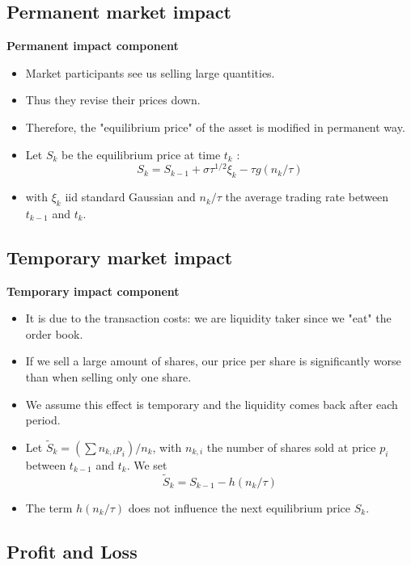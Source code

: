 \documentclass[10pt]{article}
\begin{document}
\subsection{Permanent market impact}

\textbf{Permanent impact component}

\begin{itemize} 
    \item Market participants see us selling large quantities.
    \item Thus they revise their prices down.
    \item Therefore, the "equilibrium price" of the asset is modified in permanent way.
    \item Let $S_{k}$ be the equilibrium price at time $t_{k}$ :
    $$
    S_{k}=S_{k-1}+\sigma \tau^{1 / 2} \xi_{k}-\tau g\left(n_{k} / \tau\right)
    $$
    \item with $\xi_{k}$ iid standard Gaussian and $n_{k} / \tau$ the average trading rate between $t_{k-1}$ and $t_{k}$.
\end{itemize}

\subsection{Temporary market impact}

\textbf{Temporary impact component}

\begin{itemize} 
    \item It is due to the transaction costs: we are liquidity taker since we "eat" the order book.
    \item If we sell a large amount of shares, our price per share is significantly worse than when selling only one share.
    \item We assume this effect is temporary and the liquidity comes back after each period.
    \item Let $\tilde{S}_{k}=\left(\sum n_{k, i} p_{i}\right) / n_{k}$, with $n_{k, i}$ the number of shares sold at price $p_{i}$ between $t_{k-1}$ and $t_{k} .$ We set
    $$
    \tilde{S}_{k}=S_{k-1}-h\left(n_{k} / \tau\right)
    $$
    \item The term $h\left(n_{k} / \tau\right)$ does not influence the next equilibrium price $S_{k}$.
\end{itemize}

\subsection{Profit and Loss}
\end{document}
